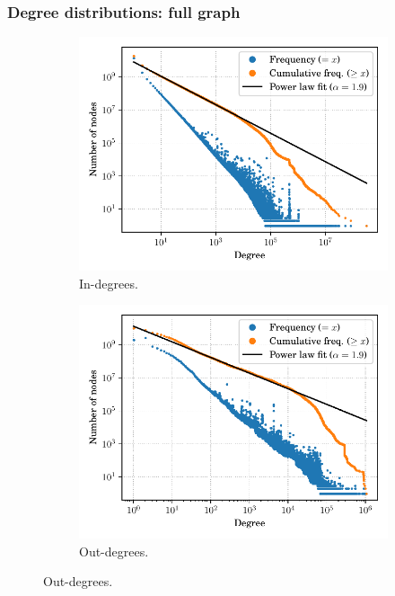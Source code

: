 \documentclass[aspectratio=169,xcolor=table]{beamer}
\begin{document}
    \begin{frame}
        \frametitle{Degree distributions: full graph}
        \begin{figure}
            \begin{subfigure}{.49\textwidth}
                \centering
                \includegraphics[width=\linewidth]{../img/topology/inout/full_in}
                \caption{In-degrees.}
            \end{subfigure}\hfill
            \begin{subfigure}{.49\textwidth}
                \centering
                \includegraphics[width=\linewidth]{../img/topology/inout/full_out}
                \caption{Out-degrees.}
            \end{subfigure}
        \end{figure}
    \end{frame}
\end{document}
